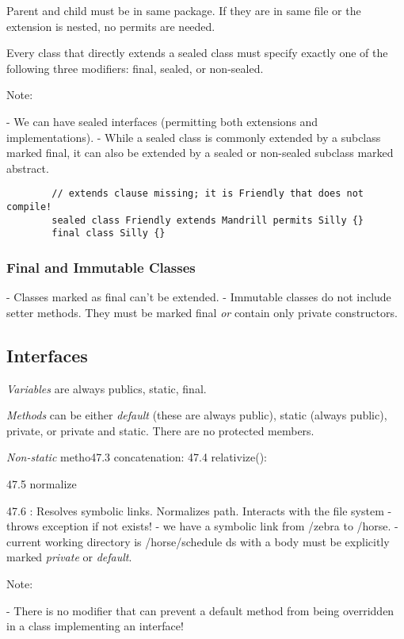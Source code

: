 \documentclass{scrartcl}
\begin{document}
    Parent and child must be in same package. If they are in same file or the extension is nested, no permits are needed.

    Every class that directly extends a sealed class must specify exactly one of the following three modifiers: final, sealed, or non-­sealed.

    Note:

    - We can have sealed interfaces (permitting both extensions and implementations).
    - While a sealed class is commonly extended by a subclass marked final, it can also be extended by a sealed or non-­sealed subclass marked abstract.

    \begin{lstlisting}
        // extends clause missing; it is Friendly that does not compile!
        sealed class Friendly extends Mandrill permits Silly {}
        final class Silly {}
    \end{lstlisting}
\subsubsection{Final and Immutable Classes}

    - Classes marked as final can’t be extended.
    - Immutable classes do not include setter methods. They must be marked final \textit{or} contain only private constructors.

\subsection{Interfaces}

    \textit{Variables} are always publics, static, final.

    \textit{Methods} can be either \textit{default} (these are always public), static (always public), private, or private and static. There are no protected members.

    \textit{Non-­static} metho47.3 concatenation:
    47.4 relativize():

    47.5 normalize

    47.6 : Resolves symbolic links. Normalizes path. Interacts with the file system - throws exception if not exists!
    - we have a symbolic link from /zebra to /horse.
    - current working directory is /horse/schedule
    ds with a body must be explicitly marked \textit{private} or \textit{default}.

    Note:

    - There is no modifier that can prevent a default method from being overridden in a class implementing an interface!
\end{document}
